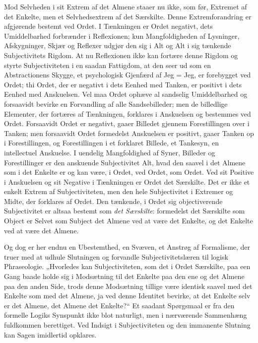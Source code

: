 \documentclass[12pt]{book}
\newcommand{\opage}[1]{\marginnote{\footnotesize\textit{[#1]}}}
\begin{document}
Mod Selvheden i sit Extrem af det Almene staaer nu ikke, som før, Extremet af det Enkelte, men et Selvhedsextrem af det Særskilte. Denne Extremforandring er afgjørende bestemt ved Ordet. I Tænkningen er Ordet negativt, dets Umiddelbarhed forbrænder i Reflexionen; kun Mangfoldigheden af Lysninger, Afskygninger, Skjær og Reflexer udgjør den sig i Alt og Alt i sig tænkende Subjectivitets Rigdom. At nu Reflexionen ikke kan fortære denne Rigdom og styrte Subjectiviteten i en saadan Fattigdom, at den seer ud som en Abstractionens Skygge, et psychologisk Gjenfærd af Jeg = Jeg, er forebygget ved Ordet; thi Ordet, der er negativt i dets Eenhed med Tanken, er positivt i dets Eenhed med Anskuelsen. Vel maa Ordet ophæve al sandselig Umiddelbarhed og forsaavidt bevirke en Forvandling af alle Sandsebilleder; men de billedlige Elementer, der fortæres af Tænkningen, forklares i Anskuelsen og bestemmes ved Ordet. Forsaavidt Ordet er negativt, gaaer Billedet gjennem Forestillingen over i Tanken; men forsaavidt Ordet formedelst Anskuelsen er positivt, gaaer Tanken op i Forestillingen, og Forestillingen i et forklaret Billede, et Tankesyn, en intellectuel Anskuelse. I uendelig Mangfoldighed af Syner, Billeder og Forestillinger er den anskuende Subjectivitet Alt, hvad den saavel i det Almene som i det Enkelte er og kan være, i Ordet, ved Ordet, som Ordet. Ved sit Positive i Anskuelsen og sit Negative i Tænkningen er Ordet det Særskilte. Det er ikke et enkelt Extrem af Subjectiviteten, men den hele Subjectivitet i Extremer og Midte, der forklares af Ordet. Den tænkende, i Ordet
\opage{336}sig objectiverende Subjectivitet er altsaa bestemt som \emph{det Særskilte}: formedelst det Særskilte som Object er Selvet som Subject det Almene ved at være det Enkelte, og det Enkelte ved at være det Almene.

Og dog er her endnu en Ubestemthed, en Svæven, et Anstrøg af Formalisme, der truer med at udhule Slutningen og forvandle Subjectivitetslæren til logisk Phraseologie. „Hvorledes kan Subjectiviteten, som det i Ordet Særskilte, paa een Gang baade holde sig i Modsætning til det Enkelte paa den ene og det Almene paa den anden Side, trods denne Modsætning tillige være identisk saavel med det Enkelte som med det Almene, ja ved denne Identitet bevirke, at det Enkelte selv er det Almene, det Almene det Enkelte?“ Et saadant Spørgsmaal er fra den formelle Logiks Synspunkt ikke blot naturligt, men i nærværende Sammenhæng fuldkommen berettiget. Ved Indsigt i Subjectiviteten og den immanente Slutning kan Sagen imidlertid opklares.
\end{document}
